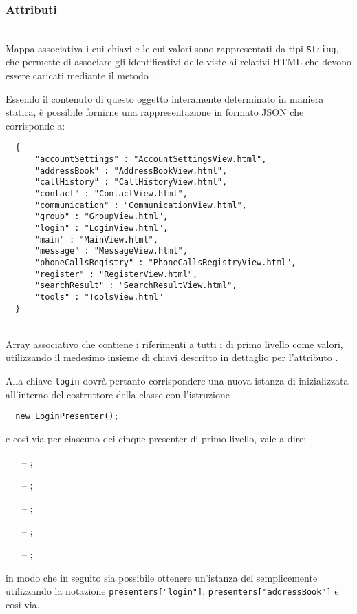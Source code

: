 \subsubsection*{Attributi}
\begin{description}

  \item{}\\
  Mappa associativa i cui chiavi e le cui valori sono rappresentati da tipi \verb'String', che permette di associare gli identificativi delle viste ai relativi  HTML che devono essere caricati mediante il metodo .
  
  Essendo il contenuto di questo oggetto interamente determinato in maniera statica, è possibile fornirne una rappresentazione in formato JSON che corrisponde a:
  \begin{verbatim}
  {
      "accountSettings" : "AccountSettingsView.html",
      "addressBook" : "AddressBookView.html",
      "callHistory" : "CallHistoryView.html",
      "contact" : "ContactView.html",
      "communication" : "CommunicationView.html",
      "group" : "GroupView.html",
      "login" : "LoginView.html",
      "main" : "MainView.html",
      "message" : "MessageView.html",
      "phoneCallsRegistry" : "PhoneCallsRegistryView.html",
      "register" : "RegisterView.html",
      "searchResult" : "SearchResultView.html",
      "tools" : "ToolsView.html"
  }
  \end{verbatim}
  
  \item{}\\
  Array associativo che contiene i riferimenti a tutti i  di primo livello come valori, utilizzando il medesimo insieme di chiavi descritto in dettaglio per l'attributo .
  
  Alla chiave \verb'login' dovrà pertanto corrispondere una nuova istanza di  inizializzata all'interno del costruttore della classe  con l'istruzione
\begin{verbatim}
  new LoginPresenter();
\end{verbatim}
e così via per ciascuno dei cinque presenter di primo livello, vale a dire:
\begin{itemize}
  \item[--] ;
  \item[--] ;
  \item[--] ;
  \item[--] ;
  \item[--] ;
\end{itemize}
in modo che in seguito sia possibile ottenere un'istanza del  semplicemente utilizzando la notazione \verb'presenters["login"]', \verb'presenters["addressBook"]' e così via.
  

\end{description}
